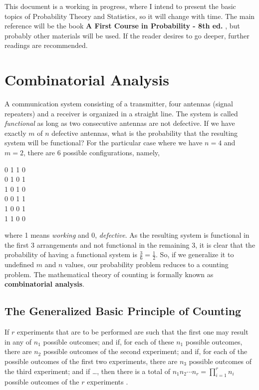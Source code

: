 \documentclass[a4paper,twocolumn]{article}
\begin{document}
This document is a working in progress, where I intend to present the basic topics of Probability Theory and Statistics, so it will change with time. The main reference will be the book \textbf{A First Course in Probability - 8th ed.} \cite{ross_2010}, but probably other materials will be used. If the reader desires to go deeper, further readings are recommended.


\section{Combinatorial Analysis}
\label{sec:comb-anal}   %

A communication system consisting of a transmitter, four antennas (signal repeaters) and a receiver is organized in a straight line. The system is called \textit{functional} as long as two consecutive antennas are not defective. If we have exactly $m$ of $n$ defective antennas, what is the probability that the resulting system will be functional? For the particular case where we have $n = 4$ and $m = 2$, there are 6 possible configurations, namely,

\begin{center}
0 1 1 0\\
0 1 0 1\\
1 0 1 0\\
0 0 1 1\\
1 0 0 1\\
1 1 0 0
\end{center}

\noindent where 1 means \textit{working} and 0, \textit{defective}. As the resulting system is functional in the first 3 arrangements and not functional in the remaining 3, it is clear that the probability of having a functional system is $\frac{3}{6} = \frac{1}{2}$. So, if we generalize it to undefined $m$ and $n$ values, our probability problem reduces to a counting problem. The mathematical theory of counting is formally known as \textbf{combinatorial analysis}.


\subsection{The Generalized Basic Principle of Counting}
\label{subsec:basic-principle}

If $r$ experiments that are to be performed are such that the first one may result in any of $n_1$ possible outcomes; and if, for each of these $n_1$ possible outcomes, there are $n_2$ possible outcomes of the second experiment; and if, for each of the possible outcomes of the first two experiments, there are $n_3$ possible outcomes of the third experiment; and if \dots , then there is a total of $n_1 n_2 \dotsm n_r = \prod_{i=1}^{r} n_i$ possible outcomes of the $r$ experiments \cite{ross_2010}.
\end{document}
